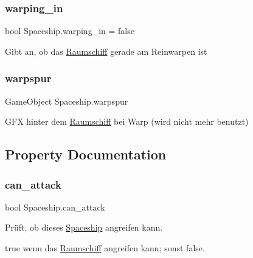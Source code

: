 \subsubsection{\texorpdfstring{warping\+\_\+in}{warping\_in}}
{\footnotesize\ttfamily bool Spaceship.\+warping\+\_\+in = false}



Gibt an, ob das \hyperlink{class_raumschiff}{Raumschiff} gerade am Reinwarpen ist 

\mbox{\label{class_spaceship_afe502a70397991dae3950bc9f96d9278}} 
\subsubsection{\texorpdfstring{warpspur}{warpspur}}
{\footnotesize\ttfamily Game\+Object Spaceship.\+warpspur}



G\+FX hinter dem \hyperlink{class_raumschiff}{Raumschiff} bei Warp (wird nicht mehr benutzt) 



\subsection{Property Documentation}
\mbox{\label{class_spaceship_a459b3d62a7e0a7e76b7a019de5b386e1}} 
\subsubsection{\texorpdfstring{can\+\_\+attack}{can\_attack}}
{\footnotesize\ttfamily bool Spaceship.\+can\+\_\+attack\hspace{0.3cm}{\ttfamily [get]}}



Prüft, ob dieses \hyperlink{class_spaceship}{Spaceship} angreifen kann. 

{\ttfamily true} wenn das \hyperlink{class_raumschiff}{Raumschiff} angreifen kann; sonst {\ttfamily false}.\mbox{\label{class_spaceship_ad98db7a91256b60c912c508cff2f001d}} 
